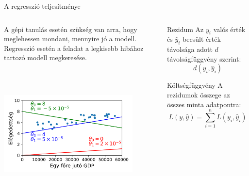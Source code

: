 \documentclass[english, aspectratio=169]{beamer}
\begin{document}
\begin{frame}{A regresszió teljesítménye}
\begin{columns}
\begin{column}{.5\textwidth}
A gépi tanulás esetén szükség van arra, hogy meglehessen mondani, mennyire jó a modell. Regresszió esetén a feladat a legkisebb hibához tartozó modell megkeresése.
\begin{center}
\includegraphics[width=7cm, height=7cm, keepaspectratio]{images/regresszio_11.png}
\end{center}
\end{column}
\begin{column}{.5\textwidth}
\begin{block}{Rezidum}
Az $y_i$ valós érték és $\hat{y}_i$ becsült érték távolsága adott $d$ távolságfüggvény szerint:
\[
d\left( y_i,\hat{y}_i \right)
\]
\end{block}
\begin{block}{Költségfüggvény}
A rezidumok összege az összes minta adatpontra:
\[
L\left( y,\hat{y}  \right) = \sum_{i=1}^n L\left( y_i,\hat{y}_i \right)
\]
\end{block}
\end{column}
\end{columns}
\end{frame}
\end{document}
